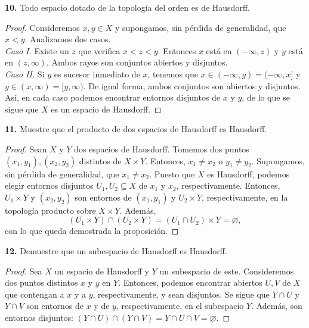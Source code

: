 \documentclass{article}
\begin{document}
\begin{mybox}
	\textbf{10. } Todo espacio dotado de la topología del orden es de Hausdorff. 
\end{mybox}	
\begin{proof}
	Consideremos $x, y \in X$ y supongamos, sin pérdida de generalidad, que $x < y$. Analizamos dos casos. \\
	\textit{Caso I. } Existe un $z$ que verifica $x < z < y$. Entonces $x$ está en $(- \infty, z)$ y $y$ está en  $(z, \infty)$. Ambos rayos son conjuntos abiertos y disjuntos. \\
	\textit{Caso II. } Si $y$ es sucesor inmediato de $x$, tenemos que $x \in ( - \infty, y) = (- \infty,x]$ y $y \in (x, \infty) = [y, \infty)$. De igual forma, ambos conjuntos son abiertos y disjuntos. \\
	Así, en cada caso podemos encontrar entornos disjuntos de $x$ y $y$, de lo que se sigue que $X$ es un espacio de Hausdorff. 
\end{proof}

\begin{mybox}
\textbf{11. } Muestre que el producto de dos espacios de Hausdorff es Hausdorff. 	
\end{mybox}	
\begin{proof}
	Sean $X$ y $Y$ dos espacios de Hausdorff. Tomemos dos puntos $(x_{1}, y_{1}), (x_{2}, y_{2})$ distintos de $X \times Y$. Entonces, $x_{1} \neq x_{2}$ o $y_{1} \neq y_{2}$. Supongamos, sin pérdida de generalidad, que $x_{1} \neq x_{2}$. Puesto que $X$ es Hausdorff, podemos elegir entornos disjuntos $U_{1}, U_{2} \subseteq X$ de $x_{1}$ y $x_{2}$, respectivamente.  Entonces, $U_{1} \times Y$ y $(x_{2}, y_{2})$ son entornos de $(x_{1}, y_{1})$ y $U_{2} \times Y$, respectivamente, en la topología producto sobre $X \times Y$. Además, 
	$$ \left( U_{1} \times Y \right) \cap \left( U_{2} \times Y \right) =   \left( U_{1} \cap U_{2} \right) \times Y = \varnothing, $$
	con lo que queda demostrada la proposición. 
\end{proof}

\begin{mybox}
	\textbf{12. } Demuestre que un subespacio de Hausdorff es Hausdorff. 
\end{mybox}	
\begin{proof}
	Sea $X$ un espacio de Hausdorff y $Y$ un subespacio de este. Consideremos dos puntos distintos $x$ y $y$ en $Y$. Entonces, podemos encontrar abiertos $U, V$ de $X$ que contengan a $x$ y a $y$, respectivamente, y sean disjuntos. Se sigue que $Y \cap U$ y $Y \cap V$ son entornos de $x$ y de $y$, respectivamente, en el subespacio $Y$. Además, son entornos disjuntos: $(Y \cap U) \cap (Y \cap V) = Y \cap U \cap V = \varnothing.$
\end{proof}
\end{document}
